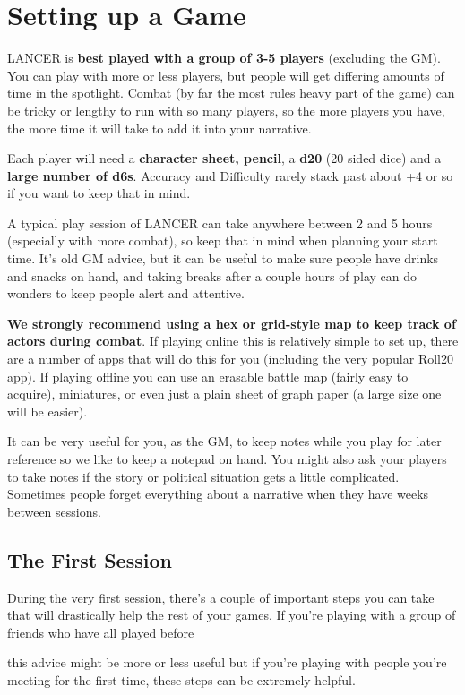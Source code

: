 \section{Setting up a Game}

LANCER is \textbf{best played with a group of 3-5 players} (excluding the GM). You can play with more
or less players, but people will get differing amounts of time in the spotlight. Combat (by far the
most rules heavy part of the game) can be tricky or lengthy to run with so many players, so the
more players you have, the more time it will take to add it into your narrative.

Each player will need a \textbf{character sheet, pencil}, a \textbf{d20} (20 sided dice) and a \textbf{large number of
d6s}. Accuracy and Difficulty rarely stack past about +4 or so if you want to keep that in mind.

A typical play session of LANCER can take anywhere between 2 and 5 hours (especially with
more combat), so keep that in mind when planning your start time. It’s old GM advice, but it can
be useful to make sure people have drinks and snacks on hand, and taking breaks after a couple
hours of play can do wonders to keep people alert and attentive.

\textbf{We strongly recommend using a hex or grid-style map to keep track of actors during
combat}. If playing online this is relatively simple to set up, there are a number of apps that will
do this for you (including the very popular Roll20 app). If playing offline you can use an erasable
battle map (fairly easy to acquire), miniatures, or even just a plain sheet of graph paper (a large
size one will be easier).

It can be very useful for you, as the GM, to keep notes while you play for later reference so we
like to keep a notepad on hand. You might also ask your players to take notes if the story or
political situation gets a little complicated. Sometimes people forget everything about a narrative
when they have weeks between sessions.

\subsection{The First Session}

During the very first session, there’s a couple of important steps you can take that will drastically
help the rest of your games. If you’re playing with a group of friends who have all played before

this advice might be more or less useful but if you’re playing with people you’re meeting for the
first time, these steps can be extremely helpful.

